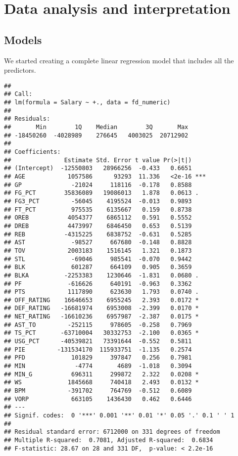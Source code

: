 \documentclass[
]{article}
\begin{document}
\hypertarget{data-analysis-and-interpretation}{%
\section{Data analysis and
interpretation}\label{data-analysis-and-interpretation}}

\hypertarget{models}{%
\subsection{Models}\label{models}}

We started creating a complete linear regression model that includes all
the predictors.

\begin{verbatim}
## 
## Call:
## lm(formula = Salary ~ +., data = fd_numeric)
## 
## Residuals:
##       Min        1Q    Median        3Q       Max 
## -18450260  -4028989    276645   4003025  20712902 
## 
## Coefficients:
##               Estimate Std. Error t value Pr(>|t|)    
## (Intercept)  -12550803   28966256  -0.433   0.6651    
## AGE            1057586      93293  11.336   <2e-16 ***
## GP              -21024     118116  -0.178   0.8588    
## FG_PCT        35836089   19086013   1.878   0.0613 .  
## FG3_PCT         -56045    4195524  -0.013   0.9893    
## FT_PCT          975535    6135667   0.159   0.8738    
## OREB           4054377    6865112   0.591   0.5552    
## DREB           4473997    6846450   0.653   0.5139    
## REB           -4315225    6838752  -0.631   0.5285    
## AST             -98527     667680  -0.148   0.8828    
## TOV            2003183    1516145   1.321   0.1873    
## STL             -69046     985541  -0.070   0.9442    
## BLK             601287     664109   0.905   0.3659    
## BLKA          -2253383    1230646  -1.831   0.0680 .  
## PF             -616626     640191  -0.963   0.3362    
## PTS            1117890     623630   1.793   0.0740 .  
## OFF_RATING    16646653    6955245   2.393   0.0172 *  
## DEF_RATING   -16681974    6953008  -2.399   0.0170 *  
## NET_RATING   -16610236    6957987  -2.387   0.0175 *  
## AST_TO         -252115     978605  -0.258   0.7969    
## TS_PCT       -63710004   30332753  -2.100   0.0365 *  
## USG_PCT      -40539821   73391644  -0.552   0.5811    
## PIE         -131534170  115933751  -1.135   0.2574    
## PFD             101829     397847   0.256   0.7981    
## MIN              -4774       4689  -1.018   0.3094    
## MIN_G           696311     299872   2.322   0.0208 *  
## WS             1845668     740418   2.493   0.0132 *  
## BPM            -391702     764769  -0.512   0.6089    
## VORP            663105    1436430   0.462   0.6446    
## ---
## Signif. codes:  0 '***' 0.001 '**' 0.01 '*' 0.05 '.' 0.1 ' ' 1
## 
## Residual standard error: 6712000 on 331 degrees of freedom
## Multiple R-squared:  0.7081, Adjusted R-squared:  0.6834 
## F-statistic: 28.67 on 28 and 331 DF,  p-value: < 2.2e-16
\end{verbatim}
\end{document}
